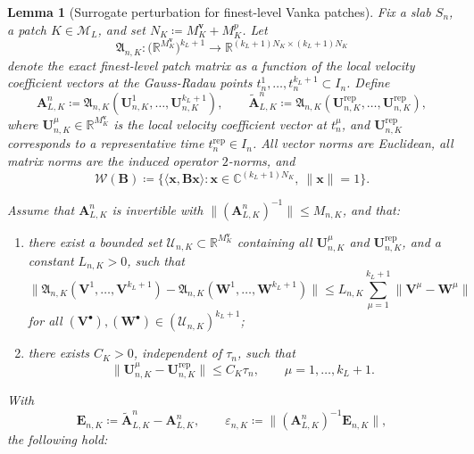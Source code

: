 \documentclass[DIV=16]{scrartcl}
\newtheorem{lemma}[theorem]{Lemma}
\newcommand{\Sn}{S_n}
\begin{document}
\begin{lemma}[Surrogate perturbation for finest-level Vanka patches]
\label{lem:patch-surrogate}
Fix a slab $\Sn$, a patch $K\in\mathcal M_L$, and set
$N_K\coloneq M_K^{\boldsymbol v}+M_K^p$. Let
\[
  \mathfrak A_{n,K}:
  \bigl(\mathbb R^{M_K^{\boldsymbol v}}\bigr)^{k_L+1}
  \to
  \mathbb R^{(k_L+1)N_K\times (k_L+1)N_K}
\]
denote the exact finest-level patch matrix as a function of the local velocity
coefficient vectors at the Gauss-Radau points
$t_n^1,\dots,t_n^{k_L+1}\subset I_n$. Define
\[
  \bm A_{L,K}^n
  \coloneq
  \mathfrak A_{n,K}(\bm U_{n,K}^1,\dots,\bm U_{n,K}^{k_L+1}),
  \qquad
  \tilde{\bm A}_{L,K}^n
  \coloneq
  \mathfrak A_{n,K}(\bm U_{n,K}^{\mathrm{rep}},\dots,\bm U_{n,K}^{\mathrm{rep}}),
\]
where $\bm U_{n,K}^\mu\in\mathbb R^{M_K^{\boldsymbol v}}$ is the local velocity
coefficient vector at $t_n^\mu$, and $\bm U_{n,K}^{\mathrm{rep}}$ corresponds
to a representative time $t_n^{\mathrm{rep}}\in I_n$. All vector norms are
Euclidean, all matrix norms are the induced operator \(2\)-norms, and
\[
  \mathcal W(\bm B)
  \coloneq
  \{\langle \bm x,\bm B\bm x\rangle:
  \bm x\in\mathbb C^{(k_L+1)N_K},\ \|\bm x\|=1\}.
\]

Assume that $\bm A_{L,K}^n$ is invertible with
$\|(\bm A_{L,K}^n)^{-1}\|\le M_{n,K}$, and that:

\begin{enumerate}[label=(\roman*),leftmargin=*,itemsep=2pt,topsep=2pt,parsep=0pt]
\item there exist a bounded set
$\mathcal U_{n,K}\subset\mathbb R^{M_K^{\boldsymbol v}}$ containing all
$\bm U_{n,K}^\mu$ and $\bm U_{n,K}^{\mathrm{rep}}$, and a constant $L_{n,K}>0$,
such that
\begin{equation}\label{eq:patch-lipschitz}
  \|\mathfrak A_{n,K}(\bm V^1,\dots,\bm V^{k_L+1})
   -\mathfrak A_{n,K}(\bm W^1,\dots,\bm W^{k_L+1})\|
  \le
  L_{n,K}\sum_{\mu=1}^{k_L+1}\|\bm V^\mu-\bm W^\mu\|
\end{equation}
for all $(\bm V^\bullet),(\bm W^\bullet)\in(\mathcal U_{n,K})^{k_L+1}$;

\item there exists \(C_K>0\), independent of \(\tau_n\), such that
\begin{equation}\label{eq:patch-approx}
  \|\bm U_{n,K}^\mu-\bm U_{n,K}^{\mathrm{rep}}\|
  \le C_K\tau_n,
  \qquad \mu=1,\dots,k_L+1.
\end{equation}
\end{enumerate}

With
\[
  \bm E_{n,K}\coloneq \tilde{\bm A}_{L,K}^n-\bm A_{L,K}^n,
  \qquad
  \varepsilon_{n,K}\coloneq
  \|(\bm A_{L,K}^n)^{-1}\bm E_{n,K}\|,
\]
the following hold:


\end{lemma}
\end{document}
